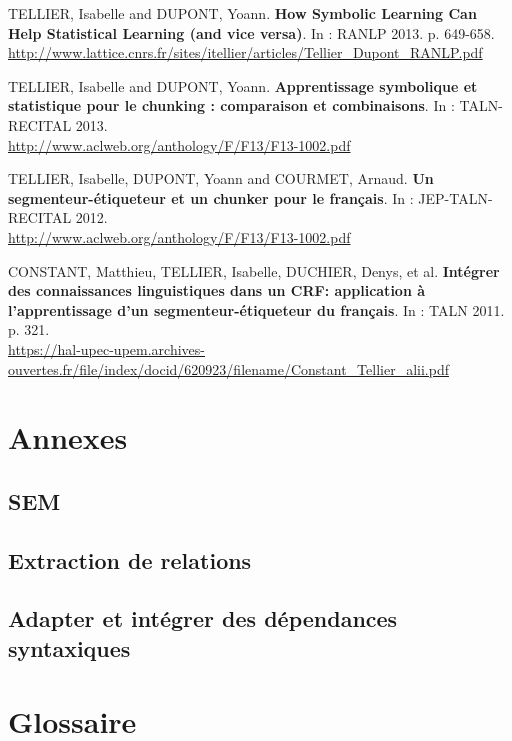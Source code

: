 \documentclass[12pt,a4paper,times,twoside,openright]{report}
\begin{document}
    TELLIER, Isabelle and DUPONT, Yoann. \textbf{How Symbolic Learning Can Help Statistical Learning (and vice versa)}. In : RANLP 2013. p. 649-658.\\
    \url{http://www.lattice.cnrs.fr/sites/itellier/articles/Tellier_Dupont_RANLP.pdf}
    
    TELLIER, Isabelle and DUPONT, Yoann. \textbf{Apprentissage symbolique et statistique pour le chunking : comparaison et combinaisons}. In : TALN-RECITAL 2013.\\
    \url{http://www.aclweb.org/anthology/F/F13/F13-1002.pdf}
    
    TELLIER, Isabelle, DUPONT, Yoann and COURMET, Arnaud. \textbf{Un segmenteur-étiqueteur et un chunker pour le français}. In : JEP-TALN-RECITAL 2012.\\
    \url{http://www.aclweb.org/anthology/F/F13/F13-1002.pdf}
    
    CONSTANT, Matthieu, TELLIER, Isabelle, DUCHIER, Denys, et al. \textbf{Intégrer des connaissances linguistiques dans un CRF: application à l'apprentissage d'un segmenteur-étiqueteur du français}. In : TALN 2011. p. 321.\\
    \url{https://hal-upec-upem.archives-ouvertes.fr/file/index/docid/620923/filename/Constant_Tellier_alii.pdf}

\chapter*{Annexes}


\section*{SEM}


\section*{Extraction de relations}
%
        \section*{Adapter et intégrer des dépendances syntaxiques}
        

\chapter*{Glossaire}

\end{document}
